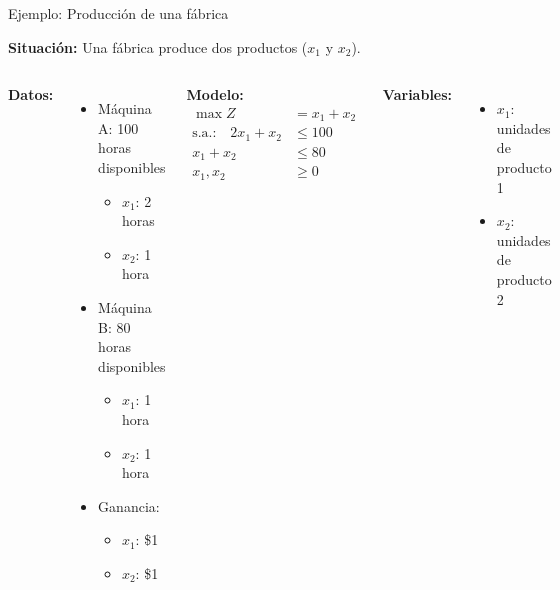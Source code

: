 \documentclass[aspectratio=169,10pt]{beamer}
\begin{document}
\begin{frame}{Ejemplo: Producción de una fábrica}

\textbf{Situación:} Una fábrica produce dos productos ($x_1$ y $x_2$).

\vspace{0.3cm}

\begin{columns}[T]
\textbf{Datos:}
\begin{itemize}
    \item Máquina A: 100 horas disponibles
    \begin{itemize}
        \item $x_1$: 2 horas
        \item $x_2$: 1 hora
    \end{itemize}
    \item Máquina B: 80 horas disponibles
    \begin{itemize}
        \item $x_1$: 1 hora
        \item $x_2$: 1 hora
    \end{itemize}
    \item Ganancia:
    \begin{itemize}
        \item $x_1$: \$1
        \item $x_2$: \$1
    \end{itemize}
\end{itemize}

\textbf{Modelo:}
\begin{align*}
\max Z &= x_1 + x_2 \\
\text{s.a.:} \quad 2x_1 + x_2 &\leq 100 \\
x_1 + x_2 &\leq 80 \\
x_1, x_2 &\geq 0
\end{align*}

\vspace{0.5cm}

\textbf{Variables:}
\begin{itemize}
    \item $x_1$: unidades de producto 1
    \item $x_2$: unidades de producto 2
\end{itemize}
\end{columns}

\end{frame}
\end{document}
